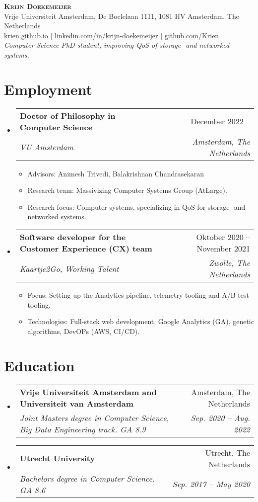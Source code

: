 \documentclass[letterpaper,11pt]{article}
\makeatletter
\newcommand{\resumeItem}[1]{
  \item\small{
    {#1 \vspace{-2pt}}
  }
}
\newcommand{\resumeSubheading}[4]{
  \vspace{-2pt}\item
    \begin{tabular*}{0.97\textwidth}[t]{l@{\extracolsep{\fill}}r}
      \textbf{#1} & #2 \\
      \textit{\small#3} & \textit{\small #4} \\
    \end{tabular*}\vspace{-7pt}
}
\newcommand{\resumeSubHeadingListStart}{\begin{itemize}[leftmargin=0.15in, label={}]}
\newcommand{\resumeSubHeadingListEnd}{\end{itemize}}
\newcommand{\resumeItemListStart}{\begin{itemize}}
\newcommand{\resumeItemListEnd}{\end{itemize}\vspace{-5pt}}
\makeatother
\begin{document}
\begin{center}
    \textbf{\Huge \scshape Krijn Doekemeijer} \\ \vspace{1pt}
    \small Vrije Universiteit Amsterdam, De Boelelaan 1111, 1081 HV Amsterdam, The Netherlands \\ \vspace{1pt}
    \href{https://krien.github.io/}{\underline{krien.github.io}} $|$
    \href{https://linkedin.com/in/krijn-doekemeijer-9692801aa}{\underline{linkedin.com/in/krijn-doekemeijer}} $|$
    \href{https://github.com/Krien}{\underline{github.com/Krien}} \\
    \textit{ Computer Science PhD student, improving QoS of storage- and networked systems. } 
\end{center}

\section{Employment}
  \resumeSubHeadingListStart
    \resumeSubheading
      {Doctor of Philosophy in Computer Science}{December 2022 --}
      {VU Amsterdam}{Amsterdam, The Netherlands}
      \resumeItemListStart
      \resumeItem{ 
        Advisors: Animesh Trivedi, Balakrishnan Chandrasekaran
      }
      \resumeItem{ 
        Research team: Massivizing Computer Systems Group (AtLarge).
      }
      \resumeItem{
        Research focus: Computer systems, specializing in QoS for storage- and networked systems.
      }
      \resumeItemListEnd
    \resumeSubheading
      {Software developer for the Customer Experience (CX) team}{Oktober 2020 -- November 2021}
      {Kaartje2Go, Working Talent}{Zwolle, The Netherlands}
      \resumeItemListStart
        \resumeItem{ 
          Focus: Setting up the Analytics pipeline, telemetry tooling and A/B test tooling.
        }
        \resumeItem{
          Technologies: Full-stack web development, Google Analytics (GA), genetic algorithms, DevOPs (AWS, CI/CD).
        }
      \resumeItemListEnd

  \resumeSubHeadingListEnd

\section{Education}
\resumeSubHeadingListStart
    \resumeSubheading
    {Vrije Universiteit Amsterdam and Universiteit van Amsterdam}{Amsterdam, The Netherlands}
    {Joint Masters degree in Computer Science, Big Data Engineering track. GA 8.9}{Sep. 2020 -- Aug. 2022}
  \resumeSubheading
    {Utrecht University}{Utrecht, The Netherlands}
    {Bachelors degree in Computer Science. GA 8.6 }{Sep. 2017 -- May 2020}
\resumeSubHeadingListEnd
\end{document}
